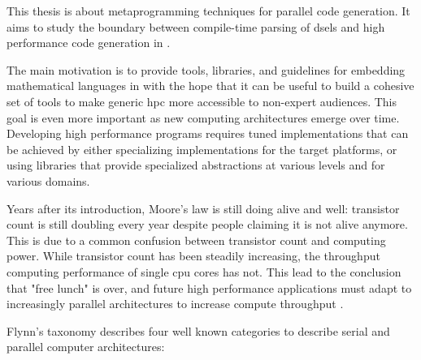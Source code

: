 \documentclass[main]{subfiles}
\begin{document}
This thesis is about metaprogramming techniques for parallel code generation.
It aims to study the boundary between compile-time parsing of
\glspl{dsel} and high performance code generation in \cpp.

The main motivation is to provide tools, libraries, and guidelines for embedding
mathematical languages in \cpp with the hope that it can be useful to build a
cohesive set of tools to make generic \gls{hpc} more accessible
to non-expert audiences. This goal is even more important as new computing
architectures emerge over time. Developing high performance programs requires
tuned implementations that can be achieved by either specializing
implementations for the target platforms, or using libraries that provide
specialized abstractions at various levels and for various domains.

Years after its introduction, Moore's law is still doing alive and well:
transistor count is still doubling every year despite people claiming
it is not alive anymore. This is due to a common confusion between
transistor count and computing power. While transistor count has been steadily
increasing, the throughput computing performance of single \gls{cpu} cores
has not.
This lead to the conclusion that "free lunch" is over, and future
high performance applications must adapt to increasingly parallel architectures
to increase compute throughput \cite{concurrency-revolution}.

Flynn's taxonomy \cite{flynn-taxonomy} describes four well known categories
to describe serial and parallel computer architectures:
\end{document}
